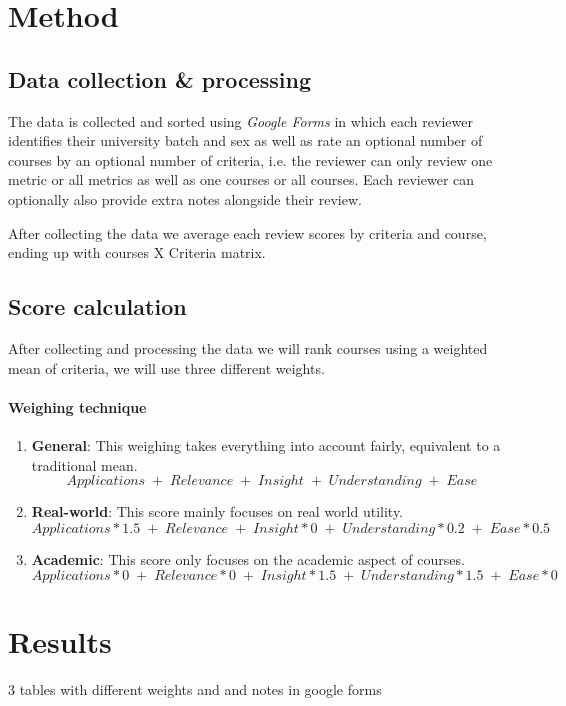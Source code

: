 \documentclass[12pt,a4paper]{article}
\begin{document}
\section{Method}
\subsection{Data collection \& processing}
The data is collected and sorted using \emph{Google Forms} in which each reviewer identifies their university batch and sex as well as rate an optional number of courses by an optional number of criteria, i.e. the reviewer can only review one metric or all metrics as well as one courses or all courses. Each reviewer can optionally also provide extra notes alongside their review.

After collecting the data we average each review scores by criteria and course, ending up with courses X Criteria matrix.

\subsection{Score calculation}
After collecting and processing the data we will rank courses using a weighted mean of criteria, we will use three different weights.

\paragraph{Weighing technique}
\begin{enumerate}
    \item \textbf{General}: This weighing takes everything into account fairly, equivalent to a traditional mean. \[Applications\; +\; Relevance\; +\; Insight\; +\; Understanding\; +\; Ease\]
    \item \textbf{Real-world}: This score mainly focuses on real world utility. \[Applications * 1.5\; +\; Relevance\; +\; Insight * 0\; +\; Understanding * 0.2\; +\; Ease * 0.5\]
    \item \textbf{Academic}: This score only focuses on the academic aspect of courses. \[Applications * 0\; +\; Relevance * 0\; +\; Insight * 1.5\; +\; Understanding * 1.5\; +\; Ease * 0\]
\end{enumerate}


\section{Results}

3 tables with different weights and and notes in google forms
\end{document}

